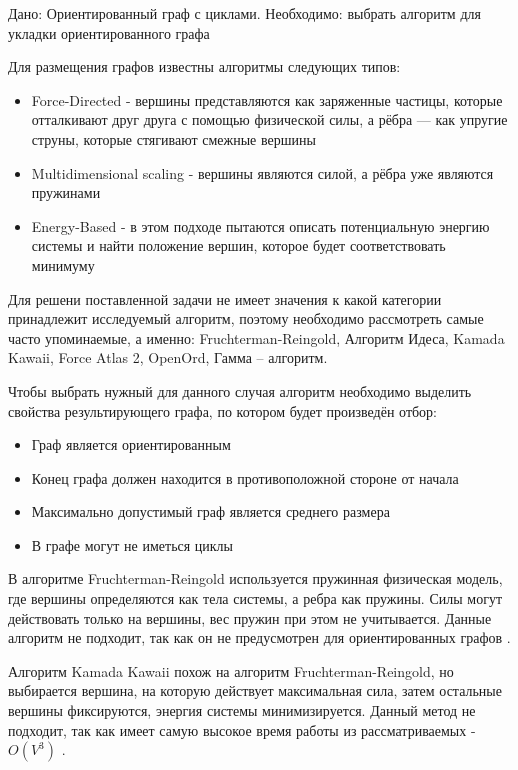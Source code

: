 \def\notedate{2022.11.21}
\def\currentauthor{Журавлев Н.В. (РК6-72Б)}

\begin{task}
Дано: Ориентированный граф с циклами.
Необходимо: выбрать алгоритм для укладки ориентированного графа
\end{task}

Для размещения графов известны алгоритмы следующих типов\cite{alg-graph}:
\begin{itemize}
\item Force-Directed - вершины представляются как заряженные частицы, которые отталкивают друг друга с помощью физической силы, а рёбра — как упругие струны, которые стягивают смежные вершины
\item Multidimensional scaling - вершины являются силой, а рёбра уже являются пружинами
\item Energy-Based - в этом подходе пытаются описать потенциальную энергию системы и найти положение вершин, которое будет соответствовать минимуму
\end{itemize}

Для решени поставленной задачи не имеет значения к какой категории принадлежит исследуемый алгоритм, поэтому необходимо рассмотреть самые часто упоминаемые, а именно: Fruchterman-Reingold, Алгоритм Идеса, Kamada Kawaii, Force Atlas 2, OpenOrd, Гамма – алгоритм.

Чтобы выбрать нужный для данного случая алгоритм необходимо выделить свойства результирующего графа, по котором будет произведён отбор:
\begin{itemize}
\item Граф является ориентированным
\item Конец графа должен находится в противоположной стороне от начала
\item Максимально допустимый граф является среднего размера
\item В графе могут не иметься циклы
\end{itemize}

В алгоритме Fruchterman-Reingold используется пружинная физическая модель, где вершины определяются как тела системы, а ребра как пружины. Силы могут действовать только на вершины, вес пружин при этом не учитывается. Данные алгоритм не подходит, так как он не предусмотрен для ориентированных графов \cite{alg-fruchterman}.

Алгоритм Kamada Kawaii похож на алгоритм Fruchterman-Reingold, но выбирается вершина, на которую действует максимальная сила, затем остальные вершины фиксируются, энергия системы минимизируется. Данный метод не подходит, так как имеет самую высокое время работы из рассматриваемых - $O(V^3)$ \cite{alg-kamada-kawai}.

